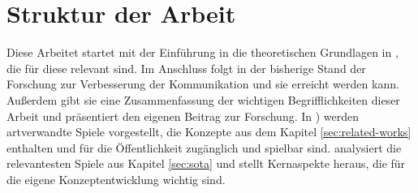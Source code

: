 \section{Struktur der Arbeit}
Diese Arbeitet startet mit der Einführung in die theoretischen Grundlagen in , die für diese relevant sind. Im Anschluss folgt in  der bisherige Stand der Forschung zur Verbesserung der Kommunikation und sie erreicht werden kann. Außerdem gibt sie eine Zusammenfassung der wichtigen Begrifflichkeiten dieser Arbeit und präsentiert den eigenen Beitrag zur Forschung. In ) werden artverwandte Spiele vorgestellt, die Konzepte aus dem Kapitel \ref{sec:related-works} enthalten und für die Öffentlichkeit zugänglich und spielbar sind.  analysiert die relevantesten Spiele aus Kapitel \ref{sec:sota} und stellt Kernaspekte heraus, die für die eigene Konzeptentwicklung wichtig sind.
